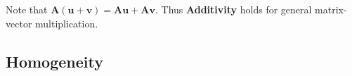 \documentclass[12pt]{article}
\begin{document}
\noindent Note that $\mathbf{A}(\mathbf{u} + \mathbf{v}) = \mathbf{A} \mathbf{u} + \mathbf{A} \mathbf{v}$.
Thus \textbf{Additivity} holds for general matrix-vector multiplication.

\newpage
\pagecolor{yellow!30}
\subsection{Homogeneity}

\begin{center}
\vfill

{\fontsize{50pt}{100pt}}
\end{center}

\vfill
\end{document}
